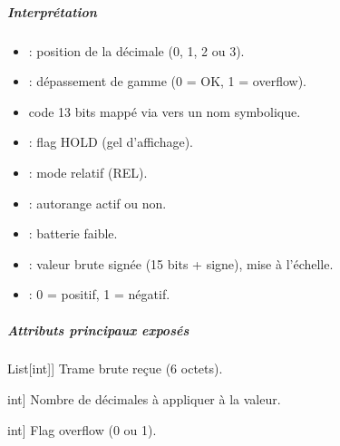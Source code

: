 \documentclass[letterpaper,10pt,french]{sphinxmanual}
\begin{document}
\begin{fulllineitems}
\subparagraph{Interprétation}
\label{\detokenize{api/hardware.devices:interpretation}}\begin{itemize}
\item {} 
\sphinxAtStartPar
{} : position de la décimale (0, 1, 2 ou 3).

\item {} 
\sphinxAtStartPar
{}       : dépassement de gamme (0 = OK, 1 = overflow).

\item {} \begin{description}
\sphinxAtStartPar
code 13 bits mappé via  vers un nom symbolique.

\end{description}

\item {} 
\sphinxAtStartPar
{} : flag HOLD (gel d’affichage).

\item {} 
\sphinxAtStartPar
{}  : mode relatif (REL).

\item {} 
\sphinxAtStartPar
{}   : autorange actif ou non.

\item {} 
\sphinxAtStartPar
{}    : batterie faible.

\item {} 
\sphinxAtStartPar
{}          : valeur brute signée (15 bits + signe), mise à l’échelle.

\item {} 
\sphinxAtStartPar
{}           : 0 = positif, 1 = négatif.

\end{itemize}


\subparagraph{Attributs principaux exposés}
\label{\detokenize{api/hardware.devices:attributs-principaux-exposes}}\begin{description}
\sphinxlineitem{raw\_data}{[}List{[}int{]}{]}
\sphinxAtStartPar
Trame brute reçue (6 octets).

\sphinxlineitem{decimal\_places}{[}int{]}
\sphinxAtStartPar
Nombre de décimales à appliquer à la valeur.

\sphinxlineitem{overflow}{[}int{]}
\sphinxAtStartPar
Flag overflow (0 ou 1).


\end{description}
\end{fulllineitems}
\end{document}
